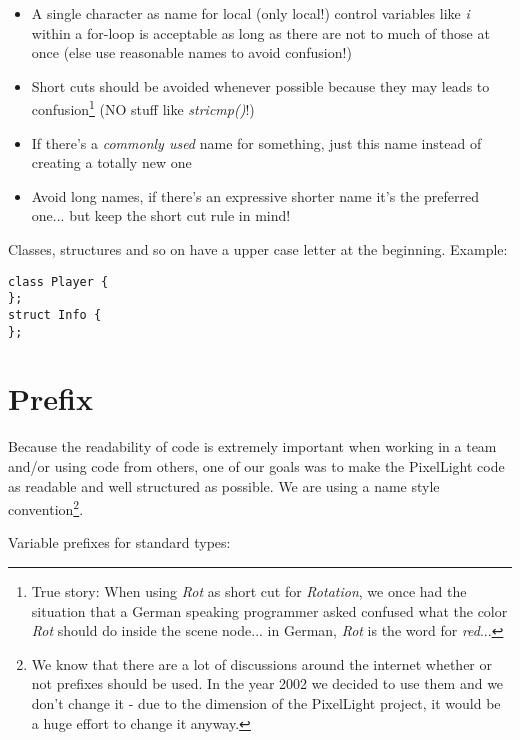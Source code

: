 \begin{itemize}
\item A single character as name for local (only local!) control variables like \emph{i} within a for-loop is acceptable as long as there are not to much of those at once (else use reasonable names to avoid confusion!)
\item Short cuts should be avoided whenever possible because they may leads to confusion\footnote{True story: When using \emph{Rot} as short cut for \emph{Rotation}, we once had the situation that a German speaking programmer asked confused what the color \emph{Rot} should do inside the scene node... in German, \emph{Rot} is the word for \emph{red}...} (NO stuff like \emph{stricmp()}!)
\item If there's a \emph{commonly used} name for something, just this name instead of creating a totally new one
\item Avoid long names, if there's an expressive shorter name it's the preferred one... but keep the short cut rule in mind!
\end{itemize}

Classes, structures and so on have a upper case letter at the beginning. Example:

\begin{lstlisting}[caption=Name convention]
class Player {
};
struct Info {
};
\end{lstlisting}




\section{Prefix}
Because the readability of code is extremely important when working in a team and/or using code from others, one of our goals was to make the PixelLight code as readable and well structured as possible. We are using a name style convention\footnote{We know that there are a lot of discussions around the internet whether or not prefixes should be used. In the year 2002 we decided to use them and we don't change it - due to the dimension of the PixelLight project, it would be a huge effort to change it anyway.}.

Variable prefixes for standard types:


